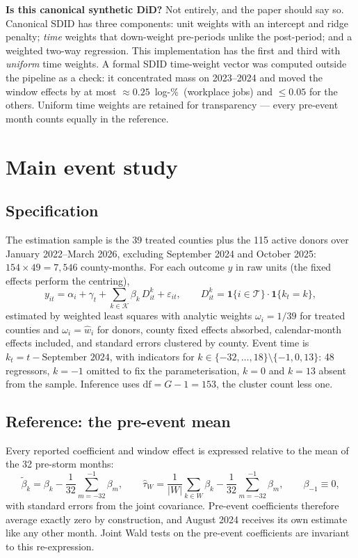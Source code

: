 \documentclass[11pt,a4paper]{article}
\newcommand{\Tr}{\mathcal{T}}
\newcommand{\ind}{\mathbf{1}}
\newcommand{\lp}{log-\%}
\begin{document}
\begin{plainbox}
\textbf{Is this canonical synthetic DiD?} Not entirely, and the paper should say so. Canonical SDID has
three components: unit weights with an intercept and ridge penalty; \emph{time} weights that
down-weight pre-periods unlike the post-period; and a weighted two-way regression. This implementation
has the first and third with \emph{uniform} time weights. A formal SDID time-weight vector was computed
outside the pipeline as a check: it concentrated mass on 2023--2024 and moved the window effects by at
most $\approx0.25$~\lp\ (workplace jobs) and $\le0.05$ for the others. Uniform time weights are retained
for transparency --- every pre-event month counts equally in the reference.
\end{plainbox}

\section{Main event study}\label{sec:es}

\subsection{Specification}
The estimation sample is the 39 treated counties plus the 115 active donors over January 2022--March
2026, excluding September 2024 and October 2025: $154\times49=7{,}546$ county-months. For each outcome
$y$ in raw units (the fixed effects perform the centring),
\begin{equation}\label{eq:twfe}
y_{it}=\alpha_i+\gamma_t+\sum_{k\in\mathcal{K}}\beta_k\,D^{k}_{it}+\varepsilon_{it},
\qquad D^{k}_{it}=\ind\{i\in\Tr\}\cdot\ind\{k_t=k\},
\end{equation}
estimated by weighted least squares with analytic weights $\omega_i=1/39$ for treated counties and
$\omega_i=\widehat w_i$ for donors, county fixed effects absorbed, calendar-month effects included, and
standard errors clustered by county. Event time is $k_t=t-\text{September 2024}$, with indicators for
$k\in\{-32,\dots,18\}\setminus\{-1,0,13\}$: 48 regressors, $k=-1$ omitted to fix the parameterisation,
$k=0$ and $k=13$ absent from the sample. Inference uses $\mathrm{df}=G-1=153$, the cluster count less
one.

\subsection{Reference: the pre-event mean}
Every reported coefficient and window effect is expressed relative to the mean of the 32 pre-storm
months:
\begin{equation}
\tilde\beta_k=\beta_k-\frac{1}{32}\sum_{m=-32}^{-1}\beta_m,\qquad
\widehat\tau_W=\frac{1}{|W|}\sum_{k\in W}\beta_k-\frac{1}{32}\sum_{m=-32}^{-1}\beta_m,
\qquad \beta_{-1}\equiv0,
\end{equation}
with standard errors from the joint covariance. Pre-event coefficients therefore average exactly zero
by construction, and August 2024 receives its own estimate like any other month. Joint Wald tests on
the pre-event coefficients are invariant to this re-expression.
\end{document}
